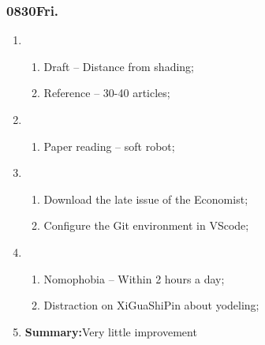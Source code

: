 \subsubsection{0830Fri.}
\begin{enumerate}
	\item \ncquaone
	\begin{enumerate}[(1)]
		\item Draft -- Distance from shading;\rightundoneBlack
		\item Reference -- 30-40 articles;\rightundoneBlack
	\end{enumerate}
	
	\item \ncquatwo	
	\begin{enumerate}[(1)]
		\item Paper reading -- soft robot;\rightundoneBlack
	\end{enumerate}
	
	\item \ncquathree
	\begin{enumerate}[(1)]
		\item Download the late issue of the Economist;\rightundoneBlack
		\item Configure the Git environment in VScode;\rightdone
	\end{enumerate}
	
	\item \ncquafour	
	\begin{enumerate}[(1)]
		\item Nomophobia -- Within 2 hours a day;\rightundoneBlack
		\item Distraction on XiGuaShiPin about yodeling;\rightundoneBlack
	\end{enumerate}
	\item \textbf{Summary:}Very little improvement
\end{enumerate}
